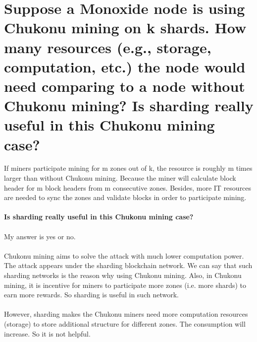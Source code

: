 \documentclass{article}
\begin{document}
\section{Suppose a Monoxide node is using Chukonu mining on k shards. How many
resources (e.g., storage, computation, etc.) the node would need comparing to a
node without Chukonu mining? Is sharding really useful in this Chukonu mining
case?}
If miners participate mining for m zones out of k, 
the resource is roughly m times larger than without Chukonu mining.
Because the miner will calculate block header for m block headers from m consecutive zones.
Besides, more IT resources are needed to sync the zones and validate blocks in order to participate mining.\\\\
\textbf{Is sharding really useful in this Chukonu mining
case?}\\\\
My answer is yes or no.\\\\
Chukonu mining aims to solve the attack with much lower computation power.
The attack appears under the sharding blockchain network. 
We can say that such sharding networks is the reason why using Chukonu mining.
Also, in Chukonu mining, 
it is incentive for miners to participate more zones (i.e. more shards) to
earn more rewards. So sharding is useful in such network.\\\\
However,
sharding makes the Chukonu miners need more computation resources (storage) to store
additional structure for different zones. The consumption will increase. 
So it is not helpful.
\end{document}
